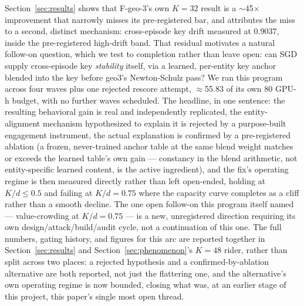 Section~\ref{sec:results} shows that F-geo-3's own $K{=}32$ result is a
$\sim$45$\times$ improvement that narrowly misses its pre-registered bar,
and attributes the miss to a second, distinct mechanism: cross-episode
key drift measured at $0.9037$, inside the pre-registered high-drift
band. That residual motivates a natural follow-on question, which we
test to completion rather than leave open: can SGD supply cross-episode
key \emph{stability} itself, via a learned, per-entity key anchor blended
into the key before geo3's Newton-Schulz pass? We ran this program across
four waves plus one rejected rescore attempt, $\approx$55.83 of its own
80 GPU-h budget, with no further waves scheduled. The headline, in one
sentence: the resulting behavioral gain is real and independently
replicated, the entity-alignment mechanism hypothesized to explain it is
rejected by a purpose-built engagement instrument, the actual explanation
is confirmed by a pre-registered ablation (a frozen, never-trained anchor
table at the same blend weight matches or exceeds the learned table's own
gain --- constancy in the blend arithmetic, not entity-specific learned
content, is the active ingredient), and the fix's operating regime is
then measured directly rather than left open-ended, holding at
$K/d\leq0.5$ and failing at $K/d{=}0.75$ where the capacity curve
completes as a cliff rather than a smooth decline. The one open follow-on
this program itself named --- value-crowding at $K/d{=}0.75$ --- is a new,
unregistered direction requiring its own design/attack/build/audit cycle,
not a continuation of this one. The full numbers, gating history, and
figures for this arc are reported together in
Section~\ref{sec:results} and Section~\ref{sec:phenomenon}'s $K{=}48$
rider, rather than split across two places: a rejected hypothesis and a
confirmed-by-ablation alternative are both reported, not just the
flattering one, and the alternative's own operating regime is now
bounded, closing what was, at an earlier stage of this project, this
paper's single most open thread.
